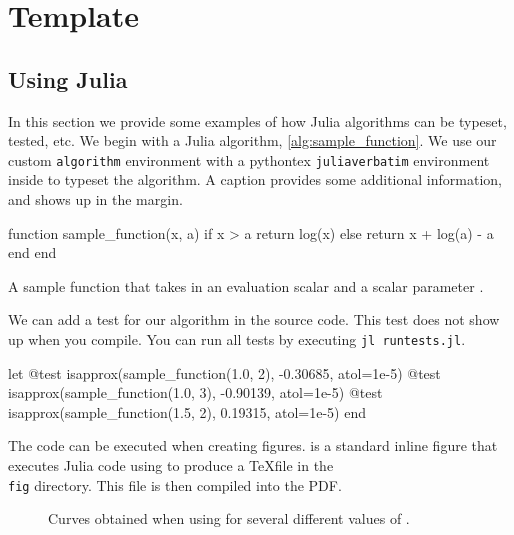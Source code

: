 \chapter{Template}

\section{Using Julia}

In this section we provide some examples of how Julia algorithms can be typeset, tested, etc.
We begin with a Julia algorithm, \cref{alg:sample_function}.
We use our custom \texttt{algorithm} environment with a pythontex \texttt{juliaverbatim} environment inside to typeset the algorithm.
A caption provides some additional information, and shows up in the margin.

\begin{algorithm}
\begin{juliaverbatim}
function sample_function(x, a)
	if x > a
		return log(x)
	else
		return x + log(a) - a
	end
end
\end{juliaverbatim}
\caption{
	\label{alg:sample_function}
	A sample function that takes in an evaluation scalar  and a scalar parameter .
}
\end{algorithm}

We can add a test for our algorithm in the source code.
This test does not show up when you compile.
You can run all tests by executing \texttt{jl runtests.jl}.

\begin{juliatest}
let
	@test isapprox(sample_function(1.0, 2), -0.30685, atol=1e-5)
	@test isapprox(sample_function(1.0, 3), -0.90139, atol=1e-5)
	@test isapprox(sample_function(1.5, 2), 0.19315, atol=1e-5)
end
\end{juliatest}

The code can be executed when creating figures.
 is a standard inline figure that executes Julia code using  to produce a \TeX file in the \texttt{\\fig} directory.
This file is then compiled into the PDF.


\begin{figure}
	\begin{center}
	\end{center}
	\caption{
		\label{fig:sample_function}
		Curves obtained when using  for several different values of .
	}
\end{figure}

